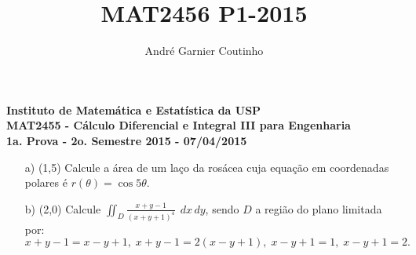 \documentclass[12pt,a4paper]{article}
\title{MAT2456 P1-2015}
\author{André Garnier Coutinho}
\begin{document}
\begin{center}
\textbf{Instituto de Matemática e Estatística da USP\\
MAT2455 - Cálculo Diferencial e Integral III para Engenharia\\}
\textbf{1a. Prova - 2o. Semestre 2015 - 07/04/2015}
\end{center}



\begin{itemize}
	\item[a)] (1,5) Calcule a área de um laço da rosácea cuja equação em coordenadas polares é $r(\theta) = \cos 5\theta$. \\
	\item[b)] (2,0) Calcule  $\displaystyle\iint_D \frac{x+y-1}{(x+y+1)^4}\; \, dx \, dy$, sendo $D$ a região do plano limitada por:
	$$ x+y-1 = x-y+1, \; x+y-1= 2(x-y+1), \; x-y+1=1, \; x-y+1 = 2.$$
	
\end{itemize}
\end{document}
